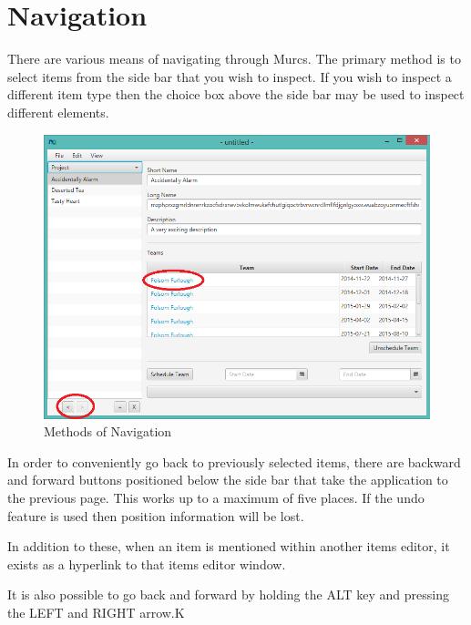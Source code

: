 \section{Navigation}

There are various means of navigating through Murcs. The primary method is to select items from the side bar that you wish to inspect. If you wish to inspect a different item type then the choice box above the side bar may be used to inspect different elements.

\begin{figure}[H]
\centering
\includegraphics[width=\textwidth]{images/screenshots/navigation.PNG}
\caption{Methods of Navigation}
\label{fig:new_project}
\end{figure}

In order to conveniently go back to previously selected items, there are backward and forward buttons positioned below the side bar that take the application to the previous page. This works up to a maximum of five places. If the undo feature is used then position information will be lost.

In addition to these, when an item is mentioned within another items editor, it exists as a hyperlink to that items editor window.

It is also possible to go back and forward by holding the ALT key and pressing the LEFT and RIGHT arrow.K